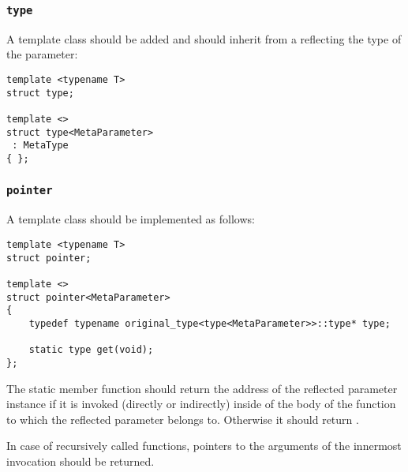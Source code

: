 \subsubsection{\texttt{type}}

A template class \verb@type@ should be added and should inherit
from a  reflecting the type of the parameter:

\begin{verbatim}
template <typename T>
struct type;

template <>
struct type<MetaParameter>
 : MetaType
{ };
\end{verbatim}

\subsubsection{\texttt{pointer}}

A template class \verb@pointer@ should be implemented as follows:

\begin{verbatim}
template <typename T>
struct pointer;

template <>
struct pointer<MetaParameter>
{
	typedef typename original_type<type<MetaParameter>>::type* type;

	static type get(void);
};
\end{verbatim}

The static member function \verb@get@ should return the address of the reflected parameter
instance if it is invoked (directly or indirectly) inside of the body of the function to which
the reflected parameter belongs to. Otherwise it should return \verb@nullptr@.

In case of recursively called functions, pointers to the arguments of the innermost
invocation should be returned.
